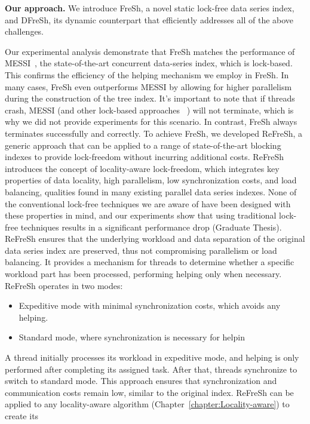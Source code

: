 \noindent
{\bf Our approach.}
We introduce FreSh, a novel static lock-free data series index, and DFreSh, 
its dynamic counterpart that efficiently addresses all of the above challenges. 

Our experimental analysis demonstrate that FreSh matches the performance of 
MESSI~\cite{PFP21-I}, the state-of-the-art concurrent data-series index, which is lock-based. 
This confirms the efficiency of the helping mechanism we employ in FreSh. In many cases, 
FreSh even outperforms MESSI by allowing for higher parallelism during the construction of the
tree index.
It's important to note that if threads crash, MESSI (and other lock-based approaches
~\cite{peng2018paris,PFP21-I,PFP21-II,hercules}) will not terminate, which is 
why we did not provide experiments for this scenario. In contrast, 
FreSh always terminates successfully and correctly.
%
To achieve FreSh, we developed ReFreSh, a generic approach that can be applied to a
range of state-of-the-art blocking indexes to provide lock-freedom without 
incurring additional costs. 
%
ReFreSh introduces the concept of locality-aware lock-freedom, which integrates
key properties of data locality, high parallelism, low synchronization costs,
and load balancing, qualities found in many existing parallel data series indexes.
None of the conventional lock-free techniques we are aware of have been designed with
these properties in mind, and our experiments show that using traditional lock-free
techniques results in a significant performance drop (Graduate Thesis).
%
ReFreSh ensures that the underlying workload and data separation of the original data series
index are preserved, thus not compromising parallelism or load balancing. It provides a mechanism
for threads to determine whether a specific workload part has been processed, performing helping
only when necessary. ReFreSh operates in two modes:
\begin{itemize}
    \item Expeditive mode with minimal synchronization costs, which avoids any helping.
    \item Standard mode, where synchronization is necessary for helpin
\end{itemize}
%
A thread initially processes its workload in expeditive mode, and helping is only performed
after completing its assigned task. After that, threads synchronize to switch to standard mode.
This approach ensures that synchronization and communication costs remain low, similar to the
original index.
%
ReFreSh can be applied to any locality-aware algorithm (Chapter~\ref{chapter:Locality-aware}) to create its
